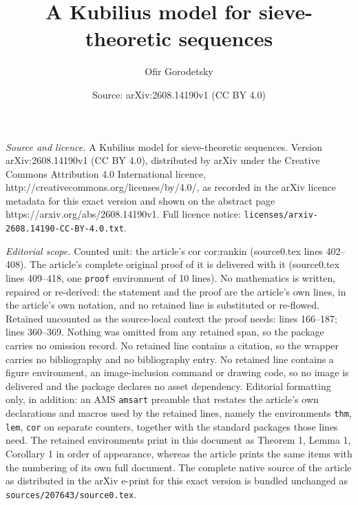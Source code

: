 \documentclass[10pt,a4paper]{amsart}
\title{A Kubilius model for sieve-theoretic sequences}
\author{Ofir Gorodetsky}
\date{Source: arXiv:2608.14190v1 (CC BY 4.0)}
\begin{document}
\maketitle

\noindent\emph{Source and licence.} A Kubilius model for sieve-theoretic sequences. Version arXiv:2608.14190v1 (CC BY 4.0), distributed by arXiv under the Creative Commons Attribution 4.0 International licence, http://creativecommons.org/licenses/by/4.0/, as recorded in the arXiv licence metadata for this exact version and shown on the abstract page https://arxiv.org/abs/2608.14190v1. Full licence notice: \texttt{licenses/arxiv-2608.14190-CC-BY-4.0.txt}.\par\smallskip

\noindent\textit{Editorial scope.} Counted unit: the article's cor cor:rankin (source0.tex lines 402--408). The article's complete original proof of it is delivered with it (source0.tex lines 409--418, one \texttt{proof} environment of 10 lines). No mathematics is written, repaired or re-derived: the statement and the proof are the article's own lines, in the article's own notation, and no retained line is substituted or re-flowed.  Retained uncounted as the source-local context the proof needs: lines 166--187; lines 360--369.  Nothing was omitted from any retained span, so the package carries no omission record.  No retained line contains a citation, so the wrapper carries no bibliography and no bibliography entry.  No retained line contains a figure environment, an image-inclusion command or drawing code, so no image is delivered and the package declares no asset dependency.  Editorial formatting only, in addition: an AMS \texttt{amsart} preamble that restates the article's own declarations and macros used by the retained lines, namely the environments \texttt{thm}, \texttt{lem}, \texttt{cor} on separate counters, together with the standard packages those lines need.  The retained environments print in this document as Theorem 1, Lemma 1, Corollary 1 in order of appearance, whereas the article prints the same items with the numbering of its own full document.  The complete native source of the article as distributed in the arXiv e-print for this exact version is bundled unchanged as \texttt{sources/207643/source0.tex}.
\end{document}
